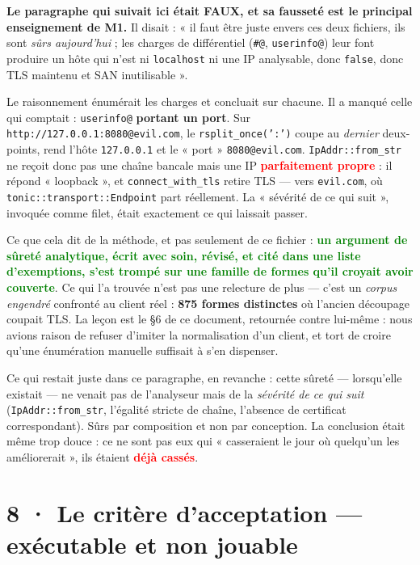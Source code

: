 \documentclass[10pt]{article}
\newcommand{\best}[1]{\textcolor{green}{\textbf{#1}}}
\newcommand{\pire}[1]{\textcolor{red}{\textbf{#1}}}
\newcommand{\code}[1]{\texttt{\small #1}}
\begin{document}
\begin{alerte}
\textbf{Le paragraphe qui suivait ici était FAUX, et sa fausseté est le principal enseignement de
M1.} Il disait : « il faut être juste envers ces deux fichiers, ils sont \emph{sûrs aujourd'hui} ;
les charges de différentiel (\code{\#@}, \code{userinfo@}) leur font produire un hôte qui n'est ni
\code{localhost} ni une IP analysable, donc \code{false}, donc TLS maintenu et SAN inutilisable ».

Le raisonnement énumérait les charges et concluait sur chacune. Il a manqué celle qui comptait :
\code{userinfo@} \textbf{portant un port}. Sur \code{http://127.0.0.1:8080@evil.com}, le
\code{rsplit\_once(':')} coupe au \emph{dernier} deux-points, rend l'hôte \code{127.0.0.1} et le
« port » \code{8080@evil.com}. \code{IpAddr::from\_str} ne reçoit donc pas une chaîne bancale mais
une IP \pire{parfaitement propre} : il répond « loopback », et \code{connect\_with\_tls} retire TLS
--- vers \code{evil.com}, où \code{tonic::transport::Endpoint} part réellement. La
« sévérité de ce qui suit », invoquée comme filet, était exactement ce qui laissait passer.

Ce que cela dit de la méthode, et pas seulement de ce fichier : \best{un argument de sûreté
analytique, écrit avec soin, révisé, et cité dans une liste d'exemptions, s'est trompé sur une
famille de formes qu'il croyait avoir couverte}. Ce qui l'a trouvée n'est pas une relecture de plus
--- c'est un \emph{corpus engendré} confronté au client réel : \textbf{875 formes distinctes} où
l'ancien découpage coupait TLS. La leçon est le §6 de ce document, retournée contre lui-même : nous
avions raison de refuser d'imiter la normalisation d'un client, et tort de croire qu'une énumération
manuelle suffisait à s'en dispenser.
\end{alerte}

Ce qui restait juste dans ce paragraphe, en revanche : cette sûreté --- lorsqu'elle existait --- ne
venait pas de l'analyseur mais de la \emph{sévérité de ce qui suit} (\code{IpAddr::from\_str},
l'égalité stricte de chaîne, l'absence de certificat correspondant). Sûrs par composition et non par
conception. La conclusion était même trop douce : ce ne sont pas eux qui « casseraient le jour où
quelqu'un les améliorerait », ils étaient \pire{déjà cassés}.

\section{8 · Le critère d'acceptation --- exécutable et non jouable}
\end{document}
